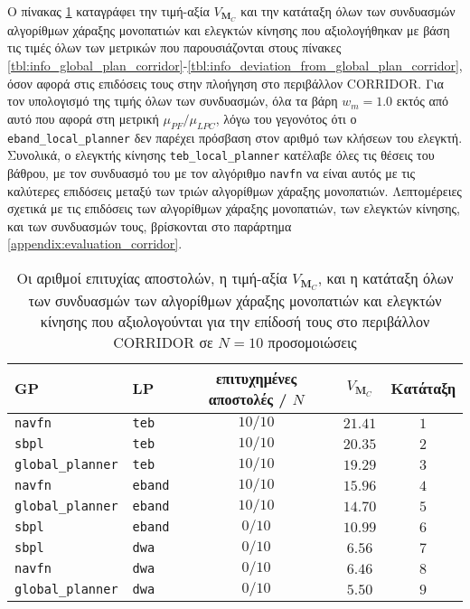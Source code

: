 Ο πίνακας \ref{tbl:rank_corridor} καταγράφει την τιμή-αξία $V_{\bm{M}_C}$ και
την κατάταξη όλων των συνδυασμών αλγορίθμων χάραξης μονοπατιών και ελεγκτών
κίνησης που αξιολογήθηκαν με βάση τις τιμές όλων των μετρικών που
παρουσιάζονται στους πίνακες
\ref{tbl:info_global_plan_corridor}-\ref{tbl:info_deviation_from_global_plan_corridor},
όσον αφορά στις επιδόσεις τους στην πλοήγηση στο περιβάλλον CORRIDOR. Για τον
υπολογισμό της τιμής όλων των συνδυασμών, όλα τα βάρη $w_m = 1.0$ εκτός από
αυτό που αφορά στη μετρική $\mu_{PF} / \mu_{LPC}$, λόγω του γεγονότος ότι ο
\texttt{eband\_local\_planner} δεν παρέχει πρόσβαση στον αριθμό των κλήσεων του
ελεγκτή. Συνολικά, ο ελεγκτής κίνησης \texttt{teb\_local\_planner} κατέλαβε
όλες τις θέσεις του βάθρου, με τον συνδυασμό του με τον αλγόριθμο
\texttt{navfn} να είναι αυτός με τις καλύτερες επιδόσεις μεταξύ των τριών
αλγορίθμων χάραξης μονοπατιών. Λεπτομέρειες σχετικά με τις επιδόσεις των
αλγορίθμων χάραξης μονοπατιών, των ελεγκτών κίνησης, και των συνδυασμών τους,
βρίσκονται στο παράρτημα \ref{appendix:evaluation_corridor}.

\begin{table}\centering
\renewcommand{\arraystretch}{1.3}
\begin{tabular}{llccc}
  GP                        & LP              & επιτυχημένες αποστολές / $N$ & $V_{\bm{M}_C}$ & Κατάταξη \\ \toprule
  \texttt{navfn}            & \texttt{teb}    & $10/10$                      & $21.41$        & $1$      \\
  \texttt{sbpl}             & \texttt{teb}    & $10/10$                      & $20.35$        & $2$      \\
  \texttt{global\_planner}  & \texttt{teb}    & $10/10$                      & $19.29$        & $3$      \\
  \texttt{navfn}            & \texttt{eband}  & $10/10$                      & $15.96$        & $4$      \\
  \texttt{global\_planner}  & \texttt{eband}  & $10/10$                      & $14.70$        & $5$      \\
  \texttt{sbpl}             & \texttt{eband}  & $0/10$                       & $10.99$        & $6$      \\
  \texttt{sbpl}             & \texttt{dwa}    & $0/10$                       & $6.56$         & $7$      \\
  \texttt{navfn}            & \texttt{dwa}    & $0/10$                       & $6.46$         & $8$      \\
  \texttt{global\_planner}  & \texttt{dwa}    & $0/10$                       & $5.50$         & $9$      \\ \bottomrule
\end{tabular}
\caption{\small Οι αριθμοί επιτυχίας αποστολών, η τιμή-αξία $V_{\bm{M}_C}$, και
         η κατάταξη όλων των συνδυασμών των αλγορίθμων χάραξης μονοπατιών και
         ελεγκτών κίνησης που αξιολογούνται για την επίδοσή τους στο
         περιβάλλον CORRIDOR σε $N=10$ προσομοιώσεις}
\label{tbl:rank_corridor}
\end{table}


